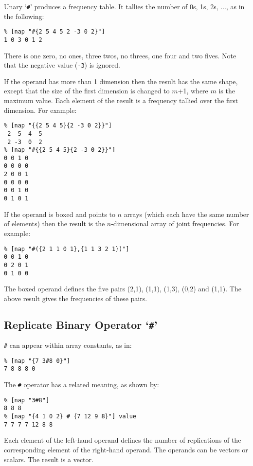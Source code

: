  Unary `\texttt{\#}' produces a frequency table. It tallies the
  number of 0s, 1s, 2s, $\ldots$, as in the following:
  \begin{verbatim}
% [nap "#{2 5 4 5 2 -3 0 2}"]
1 0 3 0 1 2
\end{verbatim}

  
 There is one zero, no ones, three twos, no threes, one four and
  two fives. Note that the negative value (\texttt{-3}) is ignored.
  
 If the operand has more than 1 dimension then the result has the
  same shape, except that the size of the first dimension is changed to
  $m$+1, where 
  $m$ is the maximum value. Each element of the result is a
  frequency tallied over the first dimension. For example:
  \begin{verbatim}
% [nap "{{2 5 4 5}{2 -3 0 2}}"]
 2  5  4  5
 2 -3  0  2
% [nap "#{{2 5 4 5}{2 -3 0 2}}"]
0 0 1 0
0 0 0 0
2 0 0 1
0 0 0 0
0 0 1 0
0 1 0 1
\end{verbatim}

  
 If the operand is boxed and points to 
  $n$ arrays (which each have the same number of elements)
  then the result is the 
  $n$-dimensional array of joint frequencies. For example:
  \begin{verbatim}
% [nap "#({2 1 1 0 1},{1 1 3 2 1})"]
0 0 1 0
0 2 0 1
0 1 0 0
\end{verbatim}

  
 The boxed operand defines the five pairs (2,1), (1,1), (1,3),
  (0,2) and (1,1). The above result gives the frequencies of these
  pairs.

\subsection{Replicate Binary Operator `\texttt{\#}'}
    \label{op-Replicate}
 
  \texttt{\#} can appear within array constants, as in:
  \begin{verbatim}
% [nap "{7 3#8 0}"]
7 8 8 8 0
\end{verbatim}

  
 The 
  \texttt{\#} operator has a related meaning, as shown by:
  \begin{verbatim}
% [nap "3#8"]
8 8 8
% [nap "{4 1 0 2} # {7 12 9 8}"] value
7 7 7 7 12 8 8
\end{verbatim}

  
 Each element of the left-hand operand defines the number of
  replications of the corresponding element of the right-hand operand.
  The operands can be vectors or scalars. The result is a vector.
  

